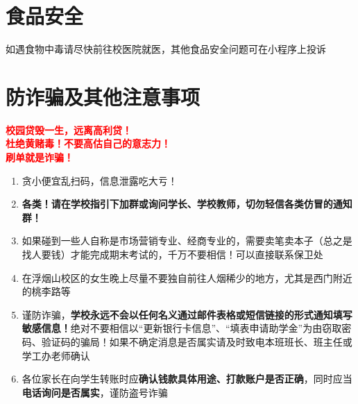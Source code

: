 \section[食品安全]{食品安全}
如遇食物中毒请尽快前往校医院就医，其他食品安全问题可在小程序上投诉

\section[防诈骗及其他注意事项]{防诈骗及其他注意事项}
\begin{table}[H]
    \centering
    \large
    \textbf{\textcolor{red}{校园贷毁一生，远离高利贷！}}\\
    \textbf{\textcolor{red}{杜绝黄赌毒！不要高估自己的意志力！}}\\
    \textbf{\textcolor{red}{刷单就是诈骗！}}
\end{table}

\begin{enumerate}
    \item 贪小便宜乱扫码，信息泄露吃大亏！
    \item \textbf{各类！请在学校指引下加群或询问学长、学校教师，切勿轻信各类仿冒的通知群！}
    \item 如果碰到一些人自称是市场营销专业、经商专业的，需要卖笔卖本子\footnotemark （总之是找人要钱）才能完成期末考试的，千万不要相信！可以直接联系保卫处
    \item 在浮烟山校区的女生晚上尽量不要独自前往人烟稀少的地方，尤其是西门附近的桃李路等
    \item 谨防诈骗，\textbf{学校永远不会以任何名义通过邮件表格或短信链接的形式通知填写敏感信息！}绝对不要相信以“更新银行卡信息”、“填表申请助学金”为由窃取密码、验证码的骗局！如果不确定消息是否属实请及时致电本班班长、班主任或学工办老师确认
    \item 各位家长在向学生转账时应\textbf{确认钱款具体用途、打款账户是否正确}，同时应当\textbf{电话询问是否属实}，谨防盗号诈骗
\end{enumerate}
